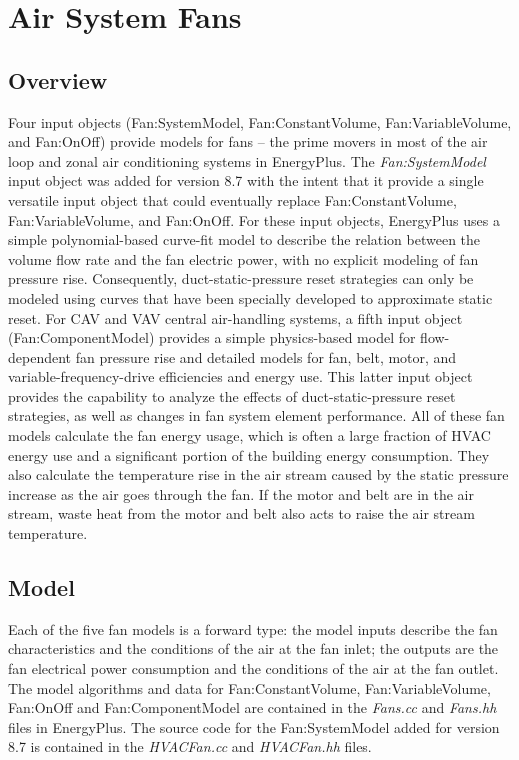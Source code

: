 \section{Air System Fans }\label{air-system-fans}

\subsection{Overview}\label{overview-002}

Four input objects (Fan:SystemModel, Fan:ConstantVolume, Fan:VariableVolume,
and Fan:OnOff) provide models for fans -- the prime movers in most of the air
loop and zonal air conditioning systems in EnergyPlus. The 
\emph{Fan:SystemModel} input object was added for version 8.7 with the intent
that it provide a single versatile input object that could eventually replace
Fan:ConstantVolume, Fan:VariableVolume, and Fan:OnOff. For these input objects,
EnergyPlus uses a simple polynomial-based curve-fit model to describe the
relation between the volume flow rate and the fan electric power, with no
explicit modeling of fan pressure rise. Consequently, duct-static-pressure
reset strategies can only be modeled using curves that have been specially
developed to approximate static reset.  For CAV and VAV central air-handling
systems, a fifth input object (Fan:ComponentModel) provides a simple
physics-based model for flow-dependent fan pressure rise and detailed models
for fan, belt, motor, and variable-frequency-drive efficiencies and energy use.
This latter input object provides the capability to analyze the effects of
duct-static-pressure reset strategies, as well as changes in fan system element
performance. All of these fan models calculate the fan energy usage, which is
often a large fraction of HVAC energy use and a significant portion of the
building energy consumption. They also calculate the temperature rise in the
air stream caused by the static pressure increase as the air goes through the
fan. If the motor and belt are in the air stream, waste heat from the motor and
belt also acts to raise the air stream temperature.

\subsection{Model}\label{model-000}

Each of the five fan models is a forward type: the model inputs describe the
fan characteristics and the conditions of the air at the fan inlet; the outputs
are the fan electrical power consumption and the conditions of the air at the
fan outlet. The model algorithms and data for Fan:ConstantVolume,
Fan:VariableVolume, Fan:OnOff and Fan:ComponentModel are contained in the
\emph{Fans.cc} and \emph{Fans.hh} files in EnergyPlus.  The source code for the
Fan:SystemModel added for version 8.7 is contained in the \emph{HVACFan.cc} and
\emph{HVACFan.hh} files.


